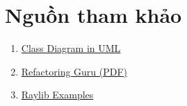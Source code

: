 \documentclass[a4paper,12pt]{report}
\begin{document}
\pagebreak
\section{Nguồn tham khảo}
\begin{enumerate}
  \item \href{https://www.youtube.com/watch?v=oBykLn64AUc}{Class Diagram in UML}
  \item \href{https://drive.google.com/file/d/16rFOFMC4pIhXA9Vhczq5nJKG7FLvJyHC/view}{Refactoring Guru (PDF)}
  \item \href{https://www.raylib.com/examples.html}{Raylib Examples}
\end{enumerate}
\end{document}
